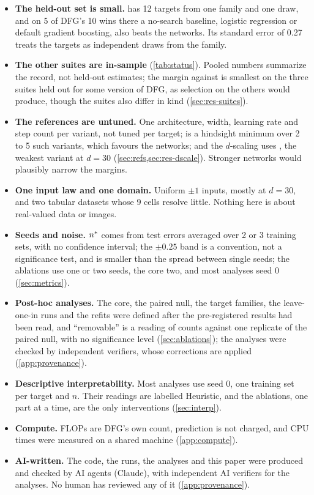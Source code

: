 \begin{itemize}
\item \textbf{The held-out set is small.}  has 12 targets from one family and one draw, and on 5 of DFG's 10 wins there a no-search baseline, logistic regression or default gradient boosting, also beats the networks. Its standard error of 0.27 treats the targets as independent draws from the family.
\item \textbf{The other suites are in-sample} (\cref{tab:status}). Pooled numbers summarize the record, not held-out estimates; the margin against  is smallest on the three suites held out for some version of DFG, as selection on the others would produce, though the suites also differ in kind (\cref{sec:res-suites}).
\item \textbf{The references are untuned.} One architecture, width, learning rate and step count per variant, not tuned per target;  is a hindsight minimum over 2 to 5 such variants, which favours the networks; and the $d$-scaling uses , the weakest variant at $d=30$ (\cref{sec:refs,sec:res-dscale}). Stronger networks would plausibly narrow the margins.
\item \textbf{One input law and one domain.} Uniform $\pm1$ inputs, mostly at $d=30$, and two tabular datasets whose 9 cells resolve little. Nothing here is about real-valued data or images.
\item \textbf{Seeds and noise.} $n^{*}$ comes from test errors averaged over 2 or 3 training sets, with no confidence interval; the $\pm0.25$ band is a convention, not a significance test, and is smaller than the spread between single seeds; the ablations use one or two seeds, the core two, and most analyses seed 0 (\cref{sec:metrics}).
\item \textbf{Post-hoc analyses.} The core, the paired null, the target families, the leave-one-in runs and the refits were defined after the pre-registered results had been read, and ``removable'' is a reading of counts against one replicate of the paired null, with no significance level (\cref{sec:ablations}); the analyses were checked by independent verifiers, whose corrections are applied (\cref{app:provenance}).
\item \textbf{Descriptive interpretability.} Most analyses use seed 0, one training set per target and $n$. Their readings are labelled Heuristic, and the ablations, one part at a time, are the only interventions (\cref{sec:interp}).
\item \textbf{Compute.} FLOPs are DFG's own count, prediction is not charged, and CPU times were measured on a shared machine (\cref{app:compute}).
\item \textbf{AI-written.} The code, the runs, the analyses and this paper were produced and checked by AI agents (Claude), with independent AI verifiers for the analyses. No human has reviewed any of it (\cref{app:provenance}).
\end{itemize}
